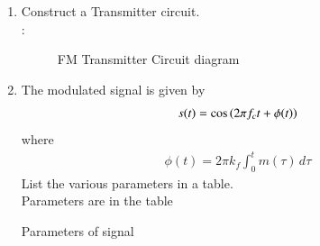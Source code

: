 \begin{enumerate}[label=\arabic*.,ref=\thesection.\theenumi]
\item Construct a Transmitter circuit.
\\
\solution:
\begin{figure}[H]
\centering
  
  \caption{FM Transmitter Circuit diagram}
  \label{ckt:circuit_2}
\end{figure}
\item The modulated signal is given by 
\begin{align}
	s(t) = \cos\left(2\pi f_c t + \phi(t)\right)
\end{align}
where
\begin{align}
	\phi(t) = 2\pi k_f \int_{0}^{t}m(\tau)\,d\tau
	\label{4.2.1.2}
\end{align}
List the various parameters in a table.
\\
\solution
Parameters are in the table 
\vspace{10mm}
\begin{table}[!ht]
  \centering
  
  \caption{Parameters of signal}
  \label{tab:tab_2}
\end{table}


\end{enumerate}
